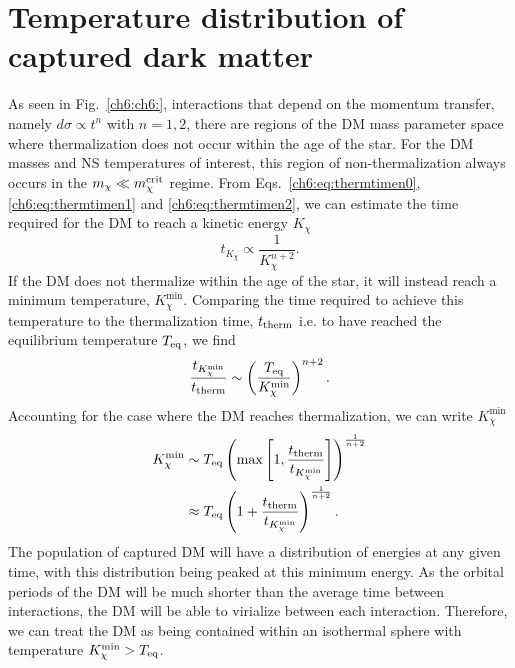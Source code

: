 \section{Temperature distribution of captured dark matter}
\label{app:sec:minTempDerivation}



As seen in Fig.~\ref{ch6:ch6:}, interactions that depend on the momentum transfer, namely $d\sigma \propto t^n$ with $n = 1,2$, there are regions of the DM mass parameter space where thermalization does not occur within the age of the star. For the DM masses and NS temperatures of interest, this region of non-thermalization always occurs in the $m_\chi\ll m_\chi^{\rm crit}$ regime.
From Eqs.~\ref{ch6:eq:thermtimen0}, \ref{ch6:eq:thermtimen1} and \ref{ch6:eq:thermtimen2},  we can estimate the time required for the DM to reach a kinetic energy $K_\chi$ 
\begin{equation}
    t_{K_\chi} \propto \frac{1}{K_\chi^{n+2}}.
\end{equation}
% 
If the DM does not thermalize within the age of the star, it will instead reach a minimum temperature, $K_\chi^{\mathrm{min}}$.  Comparing the time required to achieve this temperature to the thermalization time, $t_{\rm therm}$ i.e. to have reached the equilibrium temperature $T_{\rm eq}$, we find 
\begin{equation}
    \frac{t_{K_\chi^\mathrm{min}}}{t_{\rm therm}}  \sim \left( \frac{T_{\rm eq}}{K^{\rm min}_\chi} \right)^{n+2}. 
\end{equation}
Accounting for the case where the DM reaches thermalization, we can write $K_\chi^\mathrm{min}$
\begin{align}
    K^{\rm min}_\chi & \sim T_{\rm eq} \left(\max\left[ 1,\frac{t_{\rm therm}}{t_{K_\chi^\mathrm{min}}}\right]\right)^{\frac{1}{n + 2}}\\
           & \approx T_{\rm eq} \left( 1 + \frac{t_{\rm therm}}{t_{K_\chi^\mathrm{min}}}\right)^{\frac{1}{n + 2}}. 
\end{align}
The population of captured DM will have a distribution of energies at any given time, with this distribution being peaked at this minimum energy.
As the orbital periods of the DM will be much shorter than the average time between interactions, the DM will be able to virialize between each interaction. Therefore, we can treat the DM as being contained within an isothermal sphere with temperature $K^{\rm min}_\chi > T_{\rm eq}$. 

